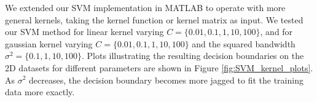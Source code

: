 We extended our SVM implementation in MATLAB to operate with more general kernels, taking the kernel function or kernel matrix as input.  We tested our SVM method for linear kernel varying $C = \{0.01,0.1,1,10,100\}$, and for gaussian kernel varying $C = \{0.01,0.1,1,10,100\}$ and the squared bandwidth $\sigma^2 = \{0.1,1,10,100\}$.  Plots illustrating the resulting decision boundaries on the 2D datasets for different parameters are shown in Figure \ref{fig:SVM_kernel_plots}.  As $\sigma^2$ decreases, the decision boundary becomes more jagged to fit the training data more exactly.  


